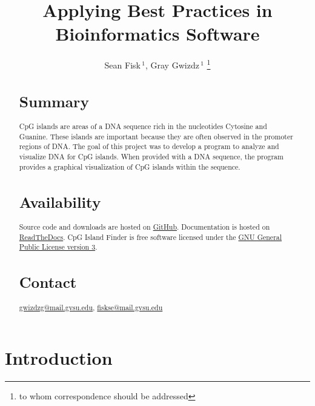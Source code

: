 \documentclass{bioinfo}
\begin{document}

\title[Applying Best Practices]{Applying Best Practices in Bioinformatics Software}
\author[Fisk-Gwizdz]{Sean Fisk\,$^{1}$, Gray Gwizdz\,$^{1}$ \footnote{to whom correspondence should be addressed}}
\address{$^{1}$Grand Valley State University\\}



\maketitle

\begin{abstract}

  \section{Summary}
  CpG islands are areas of a DNA sequence rich in the nucleotides
  Cytosine and Guanine. These islands are important because they are
  often observed in the promoter regions of DNA. The goal of this
  project was to develop a program to analyze and visualize DNA for CpG
  islands. When provided with a DNA sequence, the program provides a
  graphical visualization of CpG islands within the sequence.

  \section{Availability}
  Source code and downloads are hosted on
  \href{https://github.com/seanfisk/cpg-islands/}{GitHub}. Documentation
  is hosted on
  \href{https://cpg-islands.readthedocs.org/en/latest/}{ReadTheDocs}. CpG
  Island Finder is free software licensed under the
  \href{http://www.gnu.org/licenses/gpl.html#content}{GNU General
    Public License version 3}.

  \section{Contact} \href{gwizdzg@mail.gvsu.edu}{gwizdzg@mail.gvsu.edu}, \href{fiskse@mail.gvsu.edu}{fiskse@mail.gvsu.edu}
\end{abstract}

\section{Introduction}
\end{document}
